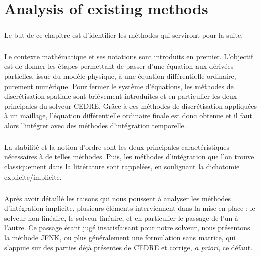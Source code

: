 \chapter{Analysis of existing methods}

\begin{tcolorbox}[title=Résumé du chapitre : Analyse des méthodes existantes, colframe=black!50!white]
  \paragraph{}
  Le but de ce chapitre est d'identifier les méthodes qui serviront pour la suite.

  \paragraph{}
  Le contexte mathématique et ses notations sont introduits en premier. L'objectif est de donner les
  étapes permettant de passer d'une équation aux dérivées partielles, issue du modèle physique, à une équation différentielle ordinaire, purement numérique. Pour fermer le système d'équations, les méthodes de
  discrétisation spatiale sont brièvement introduites et en particulier les deux principales du solveur CEDRE.
  Grâce à ces méthodes de discrétisation appliquées à un maillage, l'équation différentielle ordinaire finale est donc obtenue et il faut alors l'intégrer avec des méthodes d'intégration temporelle.

  \paragraph{}
  La stabilité et la notion d'ordre sont les deux principales caractéristiques nécessaires à de telles méthodes.
  Puis, les méthodes d'intégration que l'on trouve classiquement dans la littérature sont rappelées, en soulignant la dichotomie explicite/implicite.

  \paragraph{}
  Après avoir détaillé les raisons qui nous poussent à analyser les méthodes d'intégration implicite, plusieurs éléments interviennent dans la mise en place : le solveur non-linéaire, le solveur linéaire, et en particulier le passage de l'un à l'autre.
  Ce passage étant jugé insatisfaisant pour notre solveur, nous présentons la méthode JFNK, ou plus généralement une formulation sans matrice, qui s'appuie sur des parties déjà présentes de CEDRE et corrige, {\it a priori}, ce défaut.
\end{tcolorbox}


